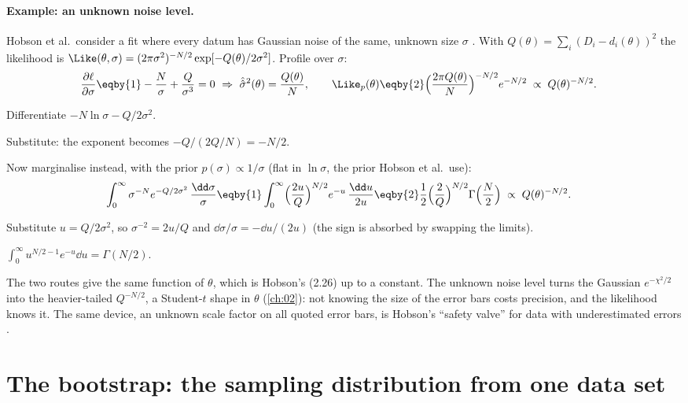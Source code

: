 \paragraph{Example: an unknown noise level.}
Hobson et al.\ consider a fit where every datum has Gaussian noise of the
same, unknown size $\sigma$ . With
$Q(\theta)=\sum_i(D_i-d_i(\theta))^2$ the likelihood is
$\Like(\theta,\sigma)=(2\pi\sigma^2)^{-N/2}\exp[-Q(\theta)/2\sigma^2]$.
Profile over $\sigma$:
\begin{align*}
  \frac{\partial\ell}{\partial\sigma}
  &\eqby{1}-\frac N\sigma+\frac{Q}{\sigma^3}=0
  \ \Rightarrow\ \hat{\hat\sigma}^2(\theta)=\frac{Q(\theta)}{N},
  \qquad
  \Like_p(\theta)\eqby{2}\Bigl(\frac{2\pi Q(\theta)}{N}\Bigr)^{-N/2}e^{-N/2}
  \;\propto\;Q(\theta)^{-N/2} .
\end{align*}
\begin{explain}
  \item Differentiate $-N\ln\sigma-Q/2\sigma^2$.
  \item Substitute: the exponent becomes $-Q/(2Q/N)=-N/2$.
\end{explain}
Now marginalise instead, with the prior $p(\sigma)\propto1/\sigma$ (flat
in $\ln\sigma$, the prior Hobson et al.\ use):
\begin{align*}
  \int_0^\infty\sigma^{-N}e^{-Q/2\sigma^2}\,\frac{\dd\sigma}{\sigma}
  &\eqby{1}\int_0^\infty\Bigl(\frac{2u}{Q}\Bigr)^{N/2}e^{-u}\,\frac{\dd u}{2u}
  \eqby{2}\frac12\Bigl(\frac2Q\Bigr)^{N/2}\Gamma\Bigl(\frac N2\Bigr)
  \;\propto\;Q(\theta)^{-N/2}.
\end{align*}
\begin{explain}
  \item Substitute $u=Q/2\sigma^2$, so $\sigma^{-2}=2u/Q$ and
        $\dd\sigma/\sigma=-\dd u/(2u)$ (the sign is absorbed by swapping the
        limits).
  \item $\int_0^\infty u^{N/2-1}e^{-u}\dd u=\Gamma(N/2)$.
\end{explain}
The two routes give the same function of $\theta$, which is Hobson's
(2.26) up to a constant. The unknown noise level turns the Gaussian
$e^{-\chi^2/2}$ into the heavier-tailed $Q^{-N/2}$, a Student-$t$ shape in
$\theta$ (\cref{ch:02}): not knowing the size of the error bars costs
precision, and the likelihood knows it. The same device, an unknown scale
factor on all quoted error bars, is Hobson's ``safety valve'' for data with
underestimated errors .
\section{The bootstrap: the sampling distribution from one data set}
\label{3b:sec:bootstrap}

